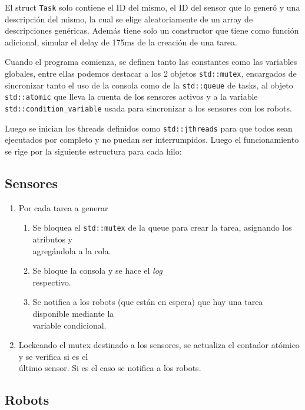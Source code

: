 \documentclass[11pt, a4paper]{article}
\begin{document}
\begin{multicols}{2}
El struct \lstinline|Task| solo contiene el ID del mismo, el ID del sensor que lo generó y una descripción del mismo, la cual se elige aleatoriamente de un array de descripciones genéricas. Además tiene solo un constructor que tiene como función adicional, simular el delay de 175ms de la creación de una tarea.

Cuando el programa comienza, se definen tanto las constantes como las variables globales, entre ellas podemos destacar a los 2 objetos \lstinline|std::mutex|, encargados de sincronizar tanto el uso de la consola como de la \lstinline|std::queue| de tasks, al objeto \lstinline|std::atomic| que lleva la cuenta de los sensores activos y a la variable \lstinline|std::condition_variable| usada para sincronizar a los sensores con los robots.

Luego se inician los threads definidos como \lstinline|std::jthreads| para que todos sean ejecutados por completo y no puedan ser interrumpidos. Luego el funcionamiento se rige por la siguiente estructura para cada hilo:

\columnbreak

\subsection{Sensores}

\begin{enumerate}[label=\Roman*.]
    \item Por cada tarea a generar 
    \begin{enumerate}[label=\roman*.]
        \item Se bloquea el \lstinline|std::mutex| de la queue para crear la tarea, asignando los atributos y\\agregándola a la cola.
        \item Se bloque la consola y se hace el \textit{log}\\respectivo.
        \item Se notifica a los robots (que están en espera) que hay una tarea disponible mediante la\\variable condicional.
    \end{enumerate}
    \item Lockeando el mutex destinado a los sensores, se actualiza el contador atómico y se verifica si es el\\último sensor. Si es el caso se notifica a los robots.
\end{enumerate}

\subsection{Robots}


\end{multicols}
\end{document}

